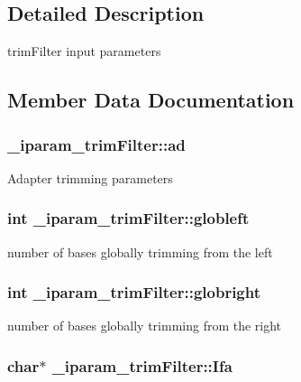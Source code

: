 \subsection{Detailed Description}
trim\+Filter input parameters 

\subsection{Member Data Documentation}
\hypertarget{struct__iparam__trimFilter_aba4b2762da9029d272905c558986b3f7}{
\subsubsection[{ad}]{ \+\_\+iparam\+\_\+trim\+Filter\+::ad}}\label{struct__iparam__trimFilter_aba4b2762da9029d272905c558986b3f7}
Adapter trimming parameters \hypertarget{struct__iparam__trimFilter_a2e626c5776d4423d20d5ec7606fe9b81}{
\subsubsection[{globleft}]{\setlength{\rightskip}{0pt plus 5cm}int \+\_\+iparam\+\_\+trim\+Filter\+::globleft}}\label{struct__iparam__trimFilter_a2e626c5776d4423d20d5ec7606fe9b81}
number of bases globally trimming from the left \hypertarget{struct__iparam__trimFilter_ad5fb4ca1786b14cd63a8467187474f51}{
\subsubsection[{globright}]{\setlength{\rightskip}{0pt plus 5cm}int \+\_\+iparam\+\_\+trim\+Filter\+::globright}}\label{struct__iparam__trimFilter_ad5fb4ca1786b14cd63a8467187474f51}
number of bases globally trimming from the right \hypertarget{struct__iparam__trimFilter_a55796cd412ef4ca61a5a799d2f64beec}{
\subsubsection[{Ifa}]{\setlength{\rightskip}{0pt plus 5cm}char$\ast$ \+\_\+iparam\+\_\+trim\+Filter\+::\+Ifa}}\label{struct__iparam__trimFilter_a55796cd412ef4ca61a5a799d2f64beec}
